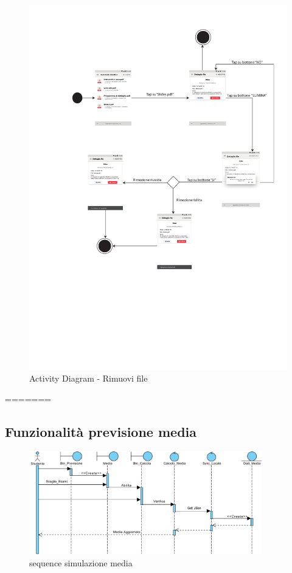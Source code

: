 \begin{figure}
	\centering
	\includegraphics[width=6in]{imgs/gruppo1/activity_diagrams/AD17_rimuovi_file.pdf}
	\caption{Activity Diagram - Rimuovi file}
	\label{diag:rimuoviFileAD}
\end{figure}
\newpage

=======
\clearpage
\subsection{Funzionalità previsione media}
\begin{figure}[H]
	\centering
	\includegraphics[width=0.9\textwidth]{imgs/gruppo3/sequence-media-valori-validi.pdf}
	\caption{sequence simulazione media}
	\label{fig:seq1-media}
\end{figure}

